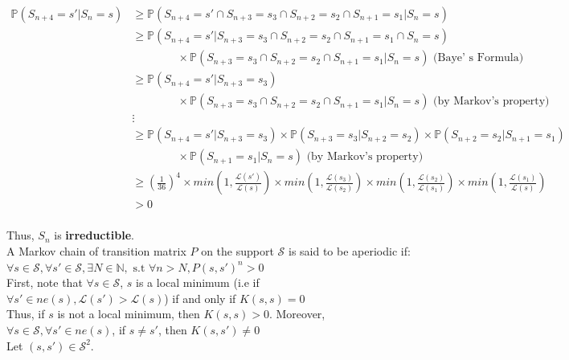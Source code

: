 $
\begin{aligned}
    \mathbb{P}(S_{n+4}=s'\vert S_n = s ) & \geqslant \mathbb{P}(S_{n+4} = s' \cap  S_{n+3}= s_3 \cap S_{n+2} = s_2 \cap S_{n+1} = s_1 \vert S_n = s) \\
    & \geqslant \mathbb{P}(S_{n+4} = s' \vert S_{n+3} = s_3 \cap S_{n+2} = s_2 \cap S_{n+1} = s_1 \cap S_n = s) \\
    & \quad\quad\quad\quad \times \mathbb{P}( S_{n+3} = s_3 \cap S_{n+2} = s_2 \cap S_{n+1} = s_1 \vert S_n = s) \text{  (Baye' s Formula)}\\
    & \geqslant \mathbb{P}(S_{n+4} = s' \vert S_{n+3} = s_3)\\
    & \quad\quad\quad\quad  \times \mathbb{P}( S_{n+3} = s_3 \cap S_{n+2} = s_2 \cap S_{n+1} = s_1 \vert S_n = s)  \text{ (by Markov's property)}\\
    & \vdots \\
    & \geqslant \mathbb{P}(S_{n+4} = s' \vert S_{n+3} = s_3) \times \mathbb{P}( S_{n+3} = s_3 \vert S_{n+2} = s_2) \times \mathbb{P}( S_{n+2} = s_2 \vert S_{n+1} = s_1) \\
    & \quad\quad\quad\quad \times \mathbb{P}( S_{n+1} = s_1 \vert S_n = s ) \text{ (by Markov's property)}\\
    & \geqslant (\frac{1}{36})^4 \times min (1, \frac{\mathcal{L}(s')}{\mathcal{L}(s)}) \times min (1, \frac{\mathcal{L}(s_3)}{\mathcal{L}(s_2)}) \times min (1, \frac{\mathcal{L}(s_2)}{\mathcal{L}(s_1)}) \times min (1, \frac{\mathcal{L}(s_1)}{\mathcal{L}(s)})  \\
    & > 0 \\
\end{aligned}
$

Thus, $S_n$ is \textbf{irreductible}.\\

A Markov chain of transition matrix $P$ on the support $\mathcal{S}$ is said to be aperiodic if: \\
$\forall s \in \mathcal{S}, \forall s' \in \mathcal{S}, \exists N \in \mathbb{N}, \text{ s.t } \forall n > N, P(s, s')^n >0 $ \cite{bodineau2015modelisation}\\

First, note that $\forall s \in \mathcal{S}$,  $s$ is a local minimum (i.e if $\forall s' \in ne(s), \mathcal{L}(s') > \mathcal{L}(s) $) if and only if $K(s,s)=0$\\

Thus, if $s$ is not a local minimum, then $K(s, s)>0$. Moreover, $ \forall s \in \mathcal{S}, \forall s' \in ne(s)$, if $s\neq s'$, then $K(s, s') \neq 0 $\\[0.3cm]
Let $(s, s')  \in \mathcal{S}^2$. \\

